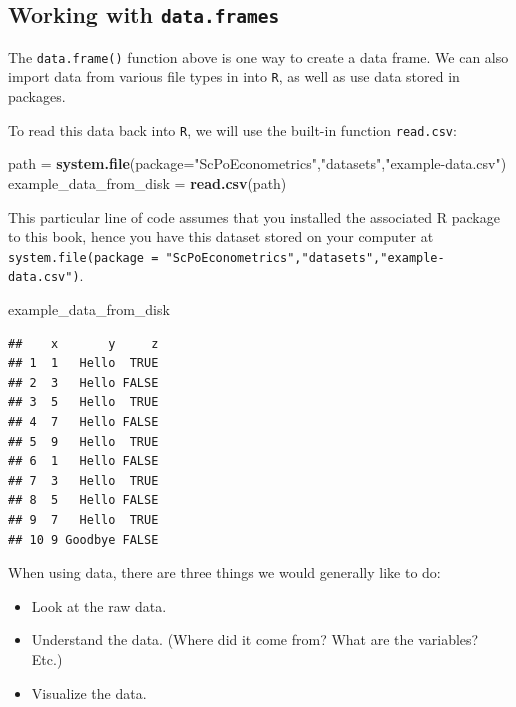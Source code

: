 \documentclass[]{book}
\newenvironment{Shaded}{\begin{snugshade}}{\end{snugshade}}
\newcommand{\KeywordTok}[1]{\textcolor[rgb]{0.13,0.29,0.53}{\textbf{#1}}}
\newcommand{\DataTypeTok}[1]{\textcolor[rgb]{0.13,0.29,0.53}{#1}}
\newcommand{\StringTok}[1]{\textcolor[rgb]{0.31,0.60,0.02}{#1}}
\newcommand{\NormalTok}[1]{#1}
\providecommand{\tightlist}{%
  \setlength{\itemsep}{0pt}\setlength{\parskip}{0pt}}
\begin{document}
\subsection{\texorpdfstring{Working with
\texttt{data.frames}}{Working with data.frames}}\label{working-with-data.frames}

The \texttt{data.frame()} function above is one way to create a data
frame. We can also import data from various file types in into
\texttt{R}, as well as use data stored in packages.

To read this data back into \texttt{R}, we will use the built-in
function \texttt{read.csv}:

\begin{Shaded}
\begin{Highlighting}[]
\NormalTok{path =}\StringTok{ }\KeywordTok{system.file}\NormalTok{(}\DataTypeTok{package=}\StringTok{"ScPoEconometrics"}\NormalTok{,}\StringTok{"datasets"}\NormalTok{,}\StringTok{"example-data.csv"}\NormalTok{)}
\NormalTok{example_data_from_disk =}\StringTok{ }\KeywordTok{read.csv}\NormalTok{(path)}
\end{Highlighting}
\end{Shaded}

This particular line of code assumes that you installed the associated R
package to this book, hence you have this dataset stored on your
computer at
\texttt{system.file(package\ =\ "ScPoEconometrics","datasets","example-data.csv")}.

\begin{Shaded}
\begin{Highlighting}[]
\NormalTok{example_data_from_disk}
\end{Highlighting}
\end{Shaded}

\begin{verbatim}
##    x       y     z
## 1  1   Hello  TRUE
## 2  3   Hello FALSE
## 3  5   Hello  TRUE
## 4  7   Hello FALSE
## 5  9   Hello  TRUE
## 6  1   Hello FALSE
## 7  3   Hello  TRUE
## 8  5   Hello FALSE
## 9  7   Hello  TRUE
## 10 9 Goodbye FALSE
\end{verbatim}

When using data, there are three things we would generally like to do:

\begin{itemize}
\tightlist
\item
  Look at the raw data.
\item
  Understand the data. (Where did it come from? What are the variables?
  Etc.)
\item
  Visualize the data.
\end{itemize}
\end{document}
